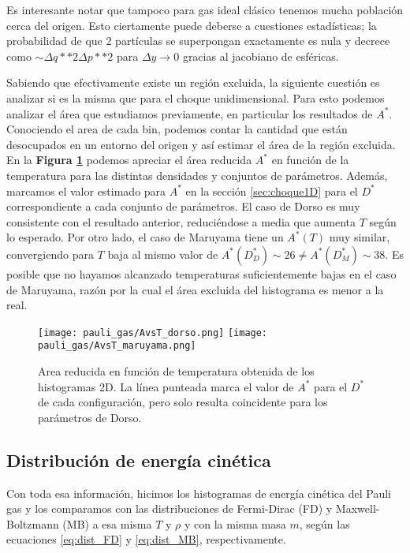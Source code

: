 Es interesante notar que tampoco para gas ideal clásico tenemos mucha población cerca del origen.
Esto ciertamente puede deberse a cuestiones estadísticas; la probabilidad de que 2 partículas se superpongan exactamente es nula y decrece como
$\sim\Delta q**2\Delta p**2$ para $\Delta y\to0$ gracias al jacobiano de esféricas.

Sabiendo que efectivamente existe un región excluida, la siguiente cuestión es analizar si es la misma que para el choque unidimensional.
Para esto podemos analizar el área que estudiamos previamente, en particular los resultados de $A^*$.
Conociendo el area de cada bin, podemos contar la cantidad que están desocupados en un entorno del origen y así estimar el área de la región excluida.
En la \textbf{Figura \ref{fig:AvsT}} podemos apreciar el área reducida $A^*$ en función de la temperatura para las distintas densidades y conjuntos de parámetros.
Además, marcamos el valor estimado para $A^*$ en la sección \ref{sec:choque1D} para el $D^*$ correspondiente a cada conjunto de parámetros.
El caso de Dorso es muy consistente con el resultado anterior, reduciéndose a media que aumenta $T$ según lo esperado.
Por otro lado, el caso de Maruyama tiene un $A^*(T)$ muy similar, convergiendo para $T$ baja al mismo valor de $A^*(D^*_D)\sim 26 \neq A^*(D^*_M)\sim 38$.
Es posible que no hayamos alcanzado temperaturas suficientemente bajas en el caso de Maruyama, razón por la cual el área excluida del histograma es menor a la real.

\begin{figure}[H]
	\centering	%
	\texttt{[image: pauli\_gas/AvsT\_dorso.png]}
	\texttt{[image: pauli\_gas/AvsT\_maruyama.png]}
	\caption{Area reducida en función de temperatura obtenida de los histogramas 2D.
  La línea punteada marca el valor de $A^*$ para el $D^*$ de cada configuración, pero solo resulta coincidente para los parámetros de Dorso.}
	\label{fig:AvsT}
\end{figure}


\subsection{Distribución de energía cinética}{\label{sec:dist_energ}}

Con toda esa información, hicimos los histogramas de energía cinética del Pauli gas y los comparamos con las distribuciones de Fermi-Dirac (FD) y Maxwell-Boltzmann (MB)
a esa misma $T$ y $\rho$ y con la misma masa $m$, según las ecuaciones \eqref{eq:dist_FD} y \eqref{eq:dist_MB}, respectivamente.

